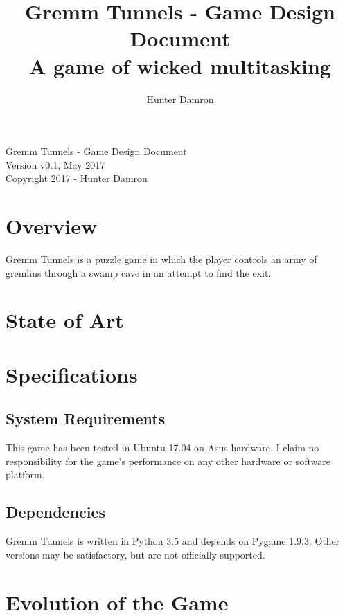 \documentclass{scrreprt}
\title{
	Gremm Tunnels - Game Design Document \\
    \large A game of wicked multitasking
}
\author{Hunter Damron}
\begin{document}
	\maketitle
	
	\null\vfill
	\noindent
	Gremm Tunnels - Game Design Document \\
	Version v0.1, May 2017 \\
	Copyright 2017 - Hunter Damron \\
	\newpage

	\tableofcontents
	\newpage
	
	\chapter{Overview}
		Gremm Tunnels is a puzzle game in which the player controls an army of gremlins through a swamp cave in an attempt to find the exit.
	
	\chapter{State of Art}
	
	\chapter{Specifications}
		\section{System Requirements}
			This game has been tested in Ubuntu 17.04 on Asus hardware. I claim no responsibility for the game's performance on any other hardware or software platform.
		
		\section{Dependencies}
			Gremm Tunnels is written in Python 3.5 and depends on Pygame 1.9.3. Other versions may be satisfactory, but are not officially supported.
			
	
	\chapter{Evolution of the Game}
			
\end{document}
